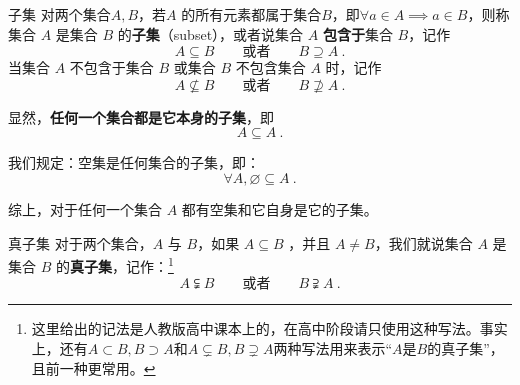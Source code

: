 \begin{definition}{子集}
对两个集合$A,B$，若$A$ 的所有元素都属于集合$B$，即$\forall a\in A\implies a\in B$，则称集合 $A$ 是集合 $B$ 的\textbf{子集}（subset），或者说集合 $A$ \textbf{包含于}集合 $B$，记作
\begin{equation}
A \subseteq B\qquad\text{或者}\qquad B \supseteq A~.
\end{equation}
当集合 $A$ 不包含于集合 $B$ 或集合 $B$ 不包含集合 $A$ 时，记作
\begin{equation}
A \nsubseteq B\qquad\text{或者}\qquad B \nsupseteq A~.
\end{equation}
\end{definition}

显然，\textbf{任何一个集合都是它本身的子集}，即
\begin{equation}
A \subseteq A~.
\end{equation}

我们规定：空集是任何集合的子集，即：
\begin{equation}
\forall A,\varnothing \subseteq A~.
\end{equation}

综上，对于任何一个集合 $A$ 都有空集和它自身是它的子集。

\begin{definition}{真子集}
对于两个集合，$A$ 与 $B$，如果 $A\subseteq B$ ，并且 $A \ne B$，我们就说集合 $A$ 是集合 $B$ 的\textbf{真子集}，记作：\footnote{这里给出的记法是人教版高中课本上的，在高中阶段请只使用这种写法。事实上，还有$A\subset B,B\supset A$和$A\subsetneq B,B\supsetneq A$两种写法用来表示“$A$是$B$的真子集”，且前一种更常用。}
\begin{equation}
A \subsetneqq B\qquad\text{或者}\qquad B \supsetneqq A~.
\end{equation}
\end{definition}
